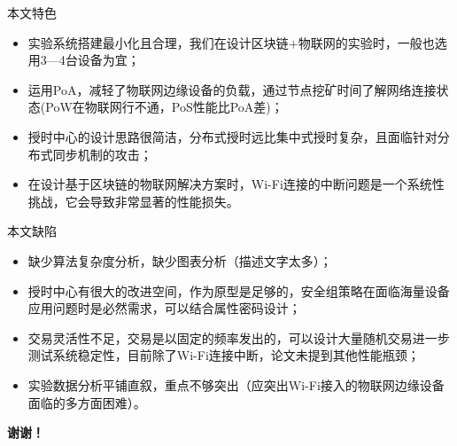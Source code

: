 \documentclass{beamer}
\begin{document}
\begin{frame}{本文特色}
	\begin{itemize}
		\item 实验系统搭建最小化且合理，我们在设计区块链+物联网的实验时，一般也选用3—4台设备为宜；
		\item 运用PoA，减轻了物联网边缘设备的负载，通过节点挖矿时间了解网络连接状态(PoW在物联网行不通，PoS性能比PoA差)；
		\item 授时中心的设计思路很简洁，分布式授时远比集中式授时复杂，且面临针对分布式同步机制的攻击；
		\item 在设计基于区块链的物联网解决方案时，Wi-Fi连接的中断问题是一个系统性挑战，它会导致非常显著的性能损失。
	\end{itemize}
\end{frame}

\begin{frame}{本文缺陷}
	\begin{itemize}
		\item 缺少算法复杂度分析，缺少图表分析（描述文字太多）；
		\item 授时中心有很大的改进空间，作为原型是足够的，安全组策略在面临海量设备应用问题时是必然需求，可以结合属性密码设计；
		\item 交易灵活性不足，交易是以固定的频率发出的，可以设计大量随机交易进一步测试系统稳定性，目前除了Wi-Fi连接中断，论文未提到其他性能瓶颈；
		\item 实验数据分析平铺直叙，重点不够突出（应突出Wi-Fi接入的物联网边缘设备面临的多方面困难）。
	\end{itemize}
\end{frame}

\begin{frame}
	\textbf{谢谢！}
\end{frame}
\end{document}
